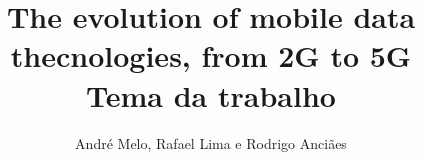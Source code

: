 \documentclass{article}
\title{The evolution of mobile data thecnologies, from 2G to 5G\\
	\large Tema da trabalho \\}
\author{André Melo, Rafael Lima e Rodrigo Anciães}
\begin{document}
\maketitle
\pagebreak
\end{document}
